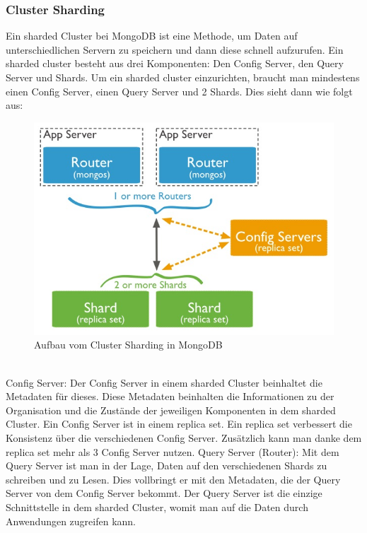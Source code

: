 \subsubsection{Cluster Sharding}
Ein sharded Cluster bei MongoDB ist eine Methode, um Daten auf unterschiedlichen Servern zu speichern und dann diese schnell aufzurufen. Ein sharded cluster besteht aus drei Komponenten: Den Config Server, den Query Server und Shards. Um ein sharded cluster einzurichten, braucht man mindestens einen Config Server, einen Query Server und 2 Shards. Dies sieht dann wie folgt aus:
\\
\begin{figure}[hbt]
	\centering
 	\includegraphics[scale=1]{images/sharded-cluster-production-architecture.jpg} 
	\caption{Aufbau vom Cluster Sharding in MongoDB}
\end{figure}
\\
Config Server: Der Config Server in einem sharded Cluster beinhaltet die Metadaten für dieses. Diese Metadaten beinhalten die Informationen zu der Organisation und die Zustände der jeweiligen Komponenten in dem sharded Cluster.  Ein Config Server ist in einem replica set. Ein replica set verbessert die Konsistenz über die verschiedenen Config Server. Zusätzlich kann man danke dem replica set mehr als 3 Config Server nutzen.
Query Server (Router): Mit dem Query Server ist man in der Lage, Daten auf den verschiedenen Shards zu schreiben und zu Lesen. Dies vollbringt er mit den Metadaten, die der Query Server von dem Config Server bekommt. Der Query Server ist die einzige Schnittstelle in dem sharded Cluster, womit man auf die Daten durch Anwendungen zugreifen kann. 
\\
